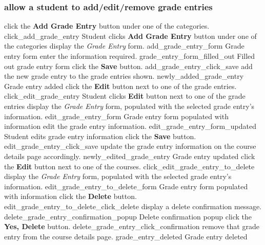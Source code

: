 \documentclass[12pt]{article}
\newenvironment{requirement}[1]
{
    \renewcommand{\thesubsubsection}{R\arabic{subsubsection}.}
    \renewcommand{\labelenumi}{
        \arabic{subsubsection}.\arabic{enumi}
    }
    \renewcommand{\labelenumii}{
        \arabic{subsubsection}.\arabic{enumi}.\arabic{enumii}
    }
    \renewcommand{\labelenumiii}{
        \arabic{subsubsection}.\arabic{enumi}.\arabic{enumii}.\arabic{enumiii}
    }
    \renewcommand{\labelenumiv}{
        \arabic{subsubsection}.\arabic{enumi}.\arabic{enumii}.\arabic{enumiii}.\arabic{enumiv}
    }
    \subsubsection{#1}
    \begin{enumerate}
}
{
    \end{enumerate}
}
\begin{document}
\begin{requirement}{\sysshall allow a student to add/edit/remove grade entries}
    \navcoursedetails
    \screenshotstep
      {\stushall click the \textbf{Add Grade Entry} button under one of the categories.}
      {click_add_grade_entry}
      {Student clicks \textbf{Add Grade Entry} button under one of the categories}
    \screenshotstep
      {\sysshall display the \emph{Grade Entry} form.}
      {add_grade_entry_form}
      {Grade entry form}
    \screenshotstep
      {\stushall enter the information required.}
      {grade_entry_form_filled_out}
      {Filled out grade entry form}
    \screenshotstep
      {\stushall click the \textbf{Save} button.}
      {add_grade_entry_click_save}
      {}
    \screenshotstep
      {\sysshall add the new grade entry to the grade entries shown.}
      {newly_added_grade_entry}
      {Grade entry added}
    \screenshotstep
      {\stushall click the \textbf{Edit} button next to one of the grade entries.}
      {click_edit_grade_entry}
      {Student clicks \textbf{Edit} button next to one of the grade entries}
    \screenshotstep
      {\sysshall display the \emph{Grade Entry} form, populated with the selected grade entry's
      information.}
      {edit_grade_entry_form}
      {Grade entry form populated with information}
    \screenshotstep
      {\stushall edit the grade entry information.}
      {edit_grade_entry_form_updated}
      {Student edits grade entry information}
    \screenshotstep
      {\stushall click the \textbf{Save} button.}
      {edit_grade_entry_click_save}
      {}
    \screenshotstep
      {\sysshall update the grade entry information on the course details page accordingly.}
      {newly_edited_grade_entry}
      {Grade entry updated}
    \screenshotstep
      {\stushall click the \textbf{Edit} button next to one of the courses.}
      {click_edit_grade_entry_to_delete}
      {}
    \screenshotstep
      {\sysshall display the \emph{Grade Entry} form, populated with the selected grade entry's
      information.}
      {edit_grade_entry_to_delete_form}
      {Grade entry form populated with information}
    \screenshotstep
      {\stushall click the \textbf{Delete} button.}
      {edit_grade_entry_to_delete_click_delete}
      {}
    \screenshotstep
      {\sysshall display a delete confirmation message.}
      {delete_grade_entry_confirmation_popup}
      {Delete confirmation popup}
    \screenshotstep
      {\stushall click the \textbf{Yes, Delete} button.}
      {delete_grade_entry_click_confirmation}
      {}
    \screenshotstep
      {\sysshall remove that grade entry from the course details page.}
      {grade_entry_deleted}
      {Grade entry deleted}
\end{requirement}
\end{document}
